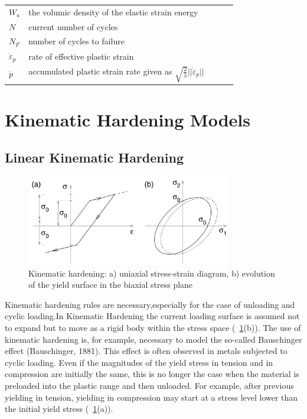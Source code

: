 \documentclass[3p,times,procedia,number]{elsarticle}
\newcommand{\figref}[1]{\figurename~\ref{#1}}
\begin{document}
\begin{flushleft}
\begin{table}[h]
\begin{tabular}{lllll}
			$W_a$ & the volumic density of the elastic strain energy &  &  &  \\
			$N$& current number of cycles &  &  &  \\
			$N_F$& number of cycles to failure &  &  &  \\
			 $ \dot{\varepsilon}_p$ & rate of effective plastic strain &  &  &  \\
			 $\dot{p}$ & accumulated plastic strain rate given as $\sqrt{\frac{2}{3}}||\dot{\varepsilon}_p||$ &  &  &  \\
			 
		\end{tabular}
	\end{table}
\end{flushleft}

\clearpage
\section{Kinematic Hardening Models}
\subsection{Linear Kinematic Hardening}

\begin{figure}[h!]
	\centering
	\includegraphics[width=0.8\textwidth]{figures//kinhard.png} 
	\caption{Kinematic hardening: a) uniaxial stress-strain diagram, b) evolution of the
		yield surface in the biaxial stress plane}
	\label{kinhard}
\end{figure}

Kinematic hardening rules are necessary,especially for the case of unloading and cyclic loading.In Kinematic Hardening the current loading surface is assumed not to expand but to move as a rigid body
within the stress space (\figref{kinhard}(b)). The use
of kinematic hardening is, for example, necessary to model the so-called Bauschinger
effect (Bauschinger, 1881). This effect is often observed in metals subjected to cyclic
loading. Even if the magnitudes of the yield stress in tension and in compression
are initially the same, this is no longer the case when the material is preloaded into
the plastic range and then unloaded. For example, after previous yielding in tension,
yielding in compression may start at a stress level lower than the initial yield stress
(\figref{kinhard}(a)).
\end{document}
